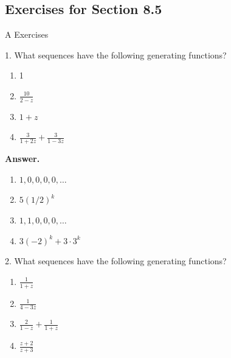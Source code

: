 \documentclass[10pt,]{book}
\theoremstyle{plain}
\theoremstyle{definition}
\theoremstyle{definition}
\theoremstyle{definition}
\theoremstyle{definition}
\numberwithin{equation}{section}
\begin{document}
\subsection[Exercises for Section 8.5]{Exercises for Section 8.5}\label{exercises-5}
\hypertarget{exercisegroup-10}{}\typeout{************************************************}
\typeout{************************************************}
A Exercises%
\begin{exercisegroup}
\item[1.]\hypertarget{exercise-37}{}What sequences have the following generating functions?%
\par
\leavevmode%
\begin{enumerate}[label=\alph*]
\item\hypertarget{li-163}{} 1%
\item\hypertarget{li-164}{}\(\frac{10}{2-z}\)%
\item\hypertarget{li-165}{} \(1 + z\)%
\item\hypertarget{li-166}{} \(\frac{3}{1+2z}+ \frac{3}{1-3z}\)%
\end{enumerate}
%
\par\smallskip
\par\smallskip
\noindent\textbf{Answer.}\hypertarget{answer-19}{}\quad
\leavevmode%
\begin{enumerate}[label=\alph*]
\item\hypertarget{li-167}{} \(1,0,0,0,0,\ldots\)%
\item\hypertarget{li-168}{} \(5(1/2)^k\) %
\item\hypertarget{li-169}{} \(1,1,0,0,0,\ldots\)%
\item\hypertarget{li-170}{} \(3(-2)^k+3\cdot 3^k\)%
\end{enumerate}
%
\item[2.]\hypertarget{exercise-38}{}What sequences have the following generating functions?%
\par
\leavevmode%
\begin{enumerate}[label=\alph*]
\item\hypertarget{li-171}{}\(\frac{1}{1+z}\)%
\item\hypertarget{li-172}{} \(\frac{1}{4-3z}\)%
\item\hypertarget{li-173}{}\(\frac{2}{1-z}+ \frac{1}{1+z}\)%
\item\hypertarget{li-174}{}\(\frac{z+2}{z+3}\)%
\end{enumerate}
%
\par\smallskip
\end{exercisegroup}
\end{document}
